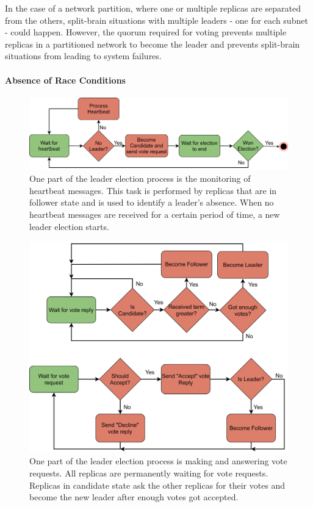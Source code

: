 In the case of a network partition, where one or multiple replicas are separated from the others, split-brain situations with multiple leaders - one for each subnet - could happen.
However, the quorum required for voting prevents multiple replicas in a partitioned network to become the leader and prevents split-brain situations from leading to system failures.

\paragraph{Absence of Race Conditions}

\begin{figure}[!h]
	\centering
	\includegraphics[width=0.9\linewidth]{images/LeaderElectionHeartbeatThread}
	\caption{One part of the leader election process is the monitoring of heartbeat messages. This task is performed by replicas that are in follower state and is used to identify a leader's absence. When no heartbeat messages are received for a certain period of time, a new leader election starts.}
	\label{fig:LeaderElectionHeartbeatThread}
\end{figure}

\begin{figure}[!ht]
	\centering
	\includegraphics[width=0.9\linewidth]{images/LeaderElectionVoteThread}
	\caption{One part of the leader election process is making and answering vote requests. All replicas are permanently waiting for vote requests. Replicas in candidate state ask the other replicas for their votes and become the new leader after enough votes got accepted.}
	\label{fig:LeaderElectionVoteThread}
\end{figure}


